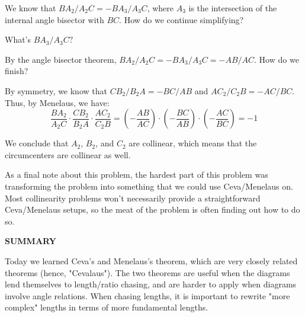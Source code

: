 We know that $BA_2/A_2C = -BA_3/A_3C$, where $A_3$ is the intersection of the internal angle bisector with $BC$. How do we continue simplifying?


What's $BA_3/A_3C?$



By the angle bisector theorem, $BA_2/A_2C = -BA_3/A_3C = -AB/AC$. How do we finish?



By symmetry, we know that $CB_2/B_2A = -BC/AB$ and $AC_2/C_2B = -AC/BC$. Thus, by Menelaus, we have: $$\frac{BA_2}{A_2 C} \cdot \frac{CB_2}{B_2 A} \cdot \frac{AC_2}{C_2 B} = \left(-\frac{AB}{AC}\right)\cdot\left(-\frac{BC}{AB}\right)\cdot\left(-\frac{AC}{BC}\right) = -1$$

We conclude that $A_2$, $B_2$, and $C_2$ are collinear, which means that the circumcenters are collinear as well.

As a final note about this problem, the hardest part of this problem was transforming the problem into something that we could use Ceva/Menelaus on. Most collinearity problems won't necessarily provide a straightforward Ceva/Menelaus setups, so the meat of the problem is often finding out how to do so.

\textbf{SUMMARY}

Today we learned Ceva's and Menelaus's theorem, which are very closely related theorems (hence, "Cevalaus"). The two theorems are useful when the diagrams lend themselves to length/ratio chasing, and are harder to apply when diagrams involve angle relations. When chasing lengths, it is important to rewrite "more complex" lengths in terms of more fundamental lengths.

